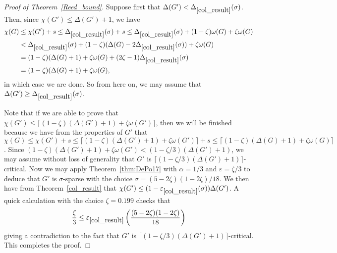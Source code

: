 \documentclass[11pt]{article}
\theoremstyle{plain}
\newcommand{\eps}{\varepsilon}
\begin{document}
\begin{proof}[Proof of Theorem~\ref{Reed_bound}]
Suppose first that $\Delta(G')< \Delta_{\ref{col_result}}(\sigma)$. Then, since $\chi(G')\le\Delta(G')+1$, we have 
\begin{align*}
\chi(G) 
& \le \chi(G') + s
\le \Delta_{\ref{col_result}}(\sigma) + s
 \le \Delta_{\ref{col_result}}(\sigma) + (1-\zeta)\omega(G) + \zeta\omega(G) \\
& < \Delta_{\ref{col_result}}(\sigma) + (1-\zeta)(\Delta(G)-2 \Delta_{\ref{col_result}}(\sigma)) + \zeta\omega(G)\\
& = (1-\zeta)(\Delta(G)+1)+\zeta\omega(G) + (2\zeta-1)\Delta_{\ref{col_result}}(\sigma)\\
& = (1-\zeta)(\Delta(G)+1)+\zeta\omega(G),
\end{align*}
in which case we are done. So from here on, we may assume that $\Delta(G')\ge \Delta_{\ref{col_result}}(\sigma)$.

Note that if we are able to prove that $\chi(G')\le \lceil(1-\zeta)(\Delta(G')+1)+\zeta\omega(G')\rceil$, then we will be finished because we have from the properties of $G'$ that $\chi(G)\le\chi(G')+s \le \lceil(1-\zeta)(\Delta(G')+1)+\zeta\omega(G')\rceil+s \le \lceil (1-\zeta)(\Delta(G)+1)+\zeta\omega(G)\rceil$.
Since $(1-\zeta)(\Delta(G')+1)+\zeta\omega(G')< (1-\zeta/3)(\Delta(G')+1)$, we may assume without loss of generality that $G'$ is $\lceil(1-\zeta/3)(\Delta(G')+1)\rceil$-critical.
Now we may apply Theorem~\ref{thm:DePo17} with $\alpha=1/3$ and $\eps=\zeta/3$ to deduce that $G'$ is $\sigma$-sparse with the choice
$\sigma=(5-2\zeta)(1-2\zeta)/18$.
We then have from Theorem~\ref{col_result} that $\chi(G') \le (1- \eps_{\ref{col_result}}(\sigma))\Delta(G')$. A quick calculation with the choice $\zeta=0.199$ checks that
\[
\frac{\zeta}3 \le \eps_{\ref{col_result}}\left(\frac{(5-2\zeta)(1-2\zeta)}{18}\right)
\]
giving a contradiction to the fact that $G'$ is $\lceil(1-\zeta/3)(\Delta(G')+1)\rceil$-critical. This completes the proof.
\end{proof}







\end{document}
